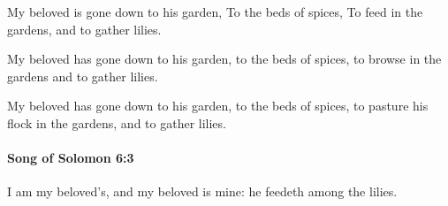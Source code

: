 			\begin{versebox}
					\item[BHS] 
					\item[LXX] 
					\item[ASV] My beloved is gone down to his garden, To the beds of spices, To feed in the gardens, and to gather lilies.
					\item[NIV] My beloved has gone down to his garden, to the beds of spices, to browse in the gardens and to gather lilies.
					\item[NRSV] My beloved has gone down to his garden, to the beds of spices, to pasture his flock in the gardens, and to gather lilies.
			\end{versebox}

		\paragraph{Song of Solomon 6:3} %
			\label{SONGOFSOLOMON-6-3}

			I am my beloved’s, and my beloved is mine: he feedeth among the lilies.

